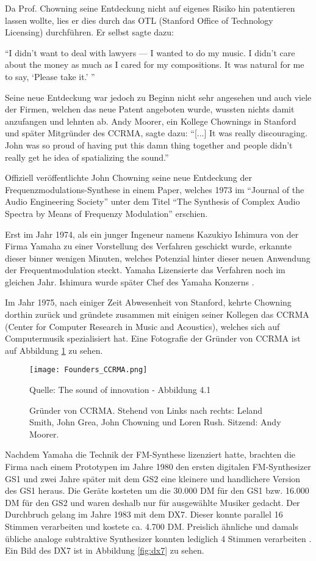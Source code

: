Da Prof. Chowning seine Entdeckung nicht auf eigenes Risiko hin patentieren lassen wollte, lies er dies durch das OTL (Stanford Office of Technology Licensing) durchführen. Er selbst sagte dazu:

``I didn’t want to deal with lawyers — I wanted to do my music. I didn’t care about the money as much as I cared for my compositions. It was natural for me to say, `Please take it.' ''\cite{fatherofdigitalmusik}

 Seine neue Entdeckung war jedoch zu Beginn nicht sehr angesehen und auch viele der Firmen, welchen das neue Patent angeboten wurde, wussten nichts damit anzufangen und lehnten ab. Andy Moorer, ein Kollege Chownings in Stanford und später Mitgründer des CCRMA, sagte dazu: ``[...] It was really discouraging. John was so proud of having put this damn thing together and people didn't really get he idea of spatializing the sound.''\cite[s. xy]{soundofinnovation}

Offiziell veröffentlichte John Chowning seine neue Entdeckung der Frequenzmodulations-Synthese in einem Paper, welches 1973 im ``Journal of the Audio Engineering Society'' unter dem Titel ``The Synthesis of Complex Audio Spectra by Means of Frequenzy Modulation'' erschien.

Erst im Jahr 1974, als ein junger Ingeneur namens Kazukiyo Ishimura von der Firma Yamaha zu einer Vorstellung des Verfahren geschickt wurde, erkannte dieser binner wenigen Minuten, welches Potenzial hinter dieser neuen Anwendung der Frequentmodulation steckt. Yamaha Lizensierte das Verfahren noch im gleichen Jahr. Ishimura wurde später Chef des Yamaha Konzerns \cite{fatherofdigitalmusik}.

Im Jahr 1975, nach einiger Zeit Abwesenheit von Stanford, kehrte Chowning dorthin zurück und gründete zusammen mit einigen seiner Kollegen das CCRMA (Center for Computer Research in Music and Acoustics), welches sich auf Computermusik spezialisiert hat.
Eine Fotografie der Gründer von CCRMA ist auf Abbildung \ref{fig:foundersCCRMA} zu sehen.

\begin{figure} [ht]
\centering
  \texttt{[image: Founders\_CCRMA.png]}
\caption{Gründer von CCRMA. Stehend von Links nach rechts: Leland Smith, John Grea, John Chowning und Loren Rush. Sitzend: Andy Moorer.}
\label{fig:foundersCCRMA}
Quelle: The sound of innovation - Abbildung 4.1
\end{figure}

Nachdem Yamaha die Technik der FM-Synthese lizenziert hatte, brachten die Firma nach einem Prototypen im Jahre 1980 den ersten digitalen FM-Synthesizer GS1 und zwei Jahre später mit dem GS2 eine kleinere und handlichere Version des GS1 heraus. Die Geräte kosteten um die 30.000 DM für den GS1 bzw. 16.000 DM für den GS2 und waren deshalb nur für ausgewählte Musiker gedacht. Der Durchbruch gelang im Jahre 1983 mit dem DX7. Dieser konnte parallel 16 Stimmen verarbeiten und kostete ca. 4.700 DM. Preislich ähnliche und damals übliche analoge subtraktive Synthesizer konnten lediglich 4 Stimmen verarbeiten \cite{fmGS1}. Ein Bild des DX7 ist in Abbildung \ref{fig:dx7} zu sehen.

